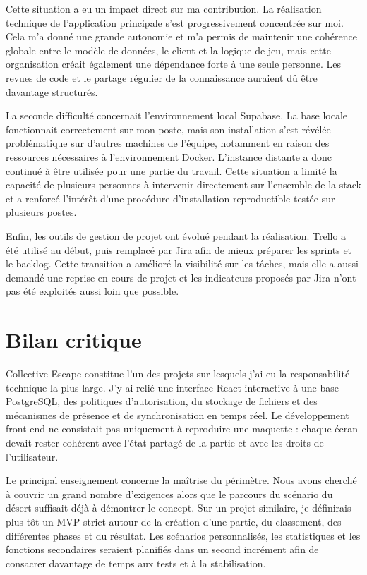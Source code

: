 Cette situation a eu un impact direct sur ma contribution. La réalisation technique de l'application principale s'est progressivement concentrée sur moi. Cela m'a donné une grande autonomie et m'a permis de maintenir une cohérence globale entre le modèle de données, le client et la logique de jeu, mais cette organisation créait également une dépendance forte à une seule personne. Les revues de code et le partage régulier de la connaissance auraient dû être davantage structurés.

La seconde difficulté concernait l'environnement local Supabase. La base locale fonctionnait correctement sur mon poste, mais son installation s'est révélée problématique sur d'autres machines de l'équipe, notamment en raison des ressources nécessaires à l'environnement Docker. L'instance distante a donc continué à être utilisée pour une partie du travail. Cette situation a limité la capacité de plusieurs personnes à intervenir directement sur l'ensemble de la stack et a renforcé l'intérêt d'une procédure d'installation reproductible testée sur plusieurs postes.

Enfin, les outils de gestion de projet ont évolué pendant la réalisation. Trello a été utilisé au début, puis remplacé par Jira afin de mieux préparer les sprints et le backlog. Cette transition a amélioré la visibilité sur les tâches, mais elle a aussi demandé une reprise en cours de projet et les indicateurs proposés par Jira n'ont pas été exploités aussi loin que possible.

\section{Bilan critique}

Collective Escape constitue l'un des projets sur lesquels j'ai eu la responsabilité technique la plus large. J'y ai relié une interface React interactive à une base PostgreSQL, des politiques d'autorisation, du stockage de fichiers et des mécanismes de présence et de synchronisation en temps réel. Le développement front-end ne consistait pas uniquement à reproduire une maquette : chaque écran devait rester cohérent avec l'état partagé de la partie et avec les droits de l'utilisateur.

Le principal enseignement concerne la maîtrise du périmètre. Nous avons cherché à couvrir un grand nombre d'exigences alors que le parcours du scénario du désert suffisait déjà à démontrer le concept. Sur un projet similaire, je définirais plus tôt un MVP strict autour de la création d'une partie, du classement, des différentes phases et du résultat. Les scénarios personnalisés, les statistiques et les fonctions secondaires seraient planifiés dans un second incrément afin de consacrer davantage de temps aux tests et à la stabilisation.

